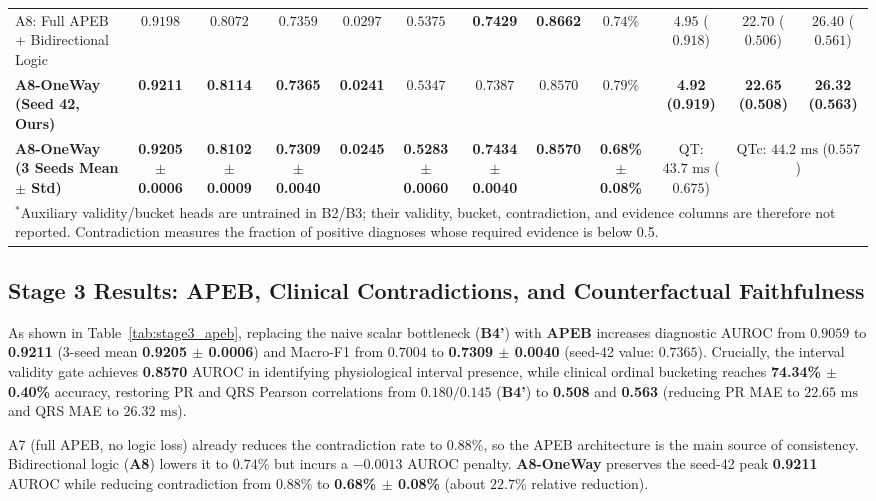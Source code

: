 \documentclass[preprint,12pt]{elsarticle}
\begin{document}
\begin{table}[htbp]
{\begin{tabular}{lccccccccccc}
A8: Full APEB + Bidirectional Logic & $0.9198$ & $0.8072$ & $0.7359$ & $0.0297$ & $0.5375$ & \textbf{0.7429} & \textbf{0.8662} & $0.74\%$ & $4.95$ ($0.918$) & $22.70$ ($0.506$) & $26.40$ ($0.561$) \\
\textbf{A8-OneWay (Seed 42, Ours)} & \textbf{0.9211} & \textbf{0.8114} & \textbf{0.7365} & \textbf{0.0241} & $0.5347$ & $0.7387$ & $0.8570$ & $0.79\%$ & \textbf{4.92 (0.919)} & \textbf{22.65 (0.508)} & \textbf{26.32 (0.563)} \\
\textbf{A8-OneWay (3 Seeds Mean $\pm$ Std)} & \textbf{0.9205 $\pm$ 0.0006} & \textbf{0.8102 $\pm$ 0.0009} & \textbf{0.7309 $\pm$ 0.0040} & \textbf{0.0245} & \textbf{0.5283 $\pm$ 0.0060} & \textbf{0.7434 $\pm$ 0.0040} & \textbf{0.8570} & \textbf{0.68\% $\pm$ 0.08\%} & QT: $43.7\text{ ms}$ ($0.675$) & \multicolumn{2}{c}{QTc: $44.2\text{ ms}$ ($0.557$)} \\
\bottomrule
\multicolumn{12}{l}{\footnotesize $^*$Auxiliary validity/bucket heads are untrained in B2/B3; their validity, bucket, contradiction, and evidence columns are therefore not reported. Contradiction measures the fraction of positive diagnoses whose required evidence is below 0.5.}
\end{tabular}%
}
\end{table}

\subsection{Stage 3 Results: APEB, Clinical Contradictions, and Counterfactual Faithfulness}
As shown in Table~\ref{tab:stage3_apeb}, replacing the naive scalar bottleneck (\textbf{B4'}) with \textbf{APEB} increases diagnostic AUROC from $0.9059$ to \textbf{0.9211} (3-seed mean \textbf{0.9205 $\pm$ 0.0006}) and Macro-F1 from $0.7004$ to \textbf{0.7309 $\pm$ 0.0040} (seed-42 value: $0.7365$). Crucially, the interval validity gate achieves \textbf{0.8570} AUROC in identifying physiological interval presence, while clinical ordinal bucketing reaches \textbf{74.34\% $\pm$ 0.40\%} accuracy, restoring PR and QRS Pearson correlations from $0.180/0.145$ (\textbf{B4'}) to \textbf{0.508} and \textbf{0.563} (reducing PR MAE to $22.65\text{ ms}$ and QRS MAE to $26.32\text{ ms}$).

A7 (full APEB, no logic loss) already reduces the contradiction rate to $0.88\%$, so the APEB architecture is the main source of consistency. Bidirectional logic (\textbf{A8}) lowers it to $0.74\%$ but incurs a $-0.0013$ AUROC penalty. \textbf{A8-OneWay} preserves the seed-42 peak \textbf{0.9211} AUROC while reducing contradiction from $0.88\%$ to \textbf{0.68\% $\pm$ 0.08\%} (about $22.7\%$ relative reduction).
\end{document}
